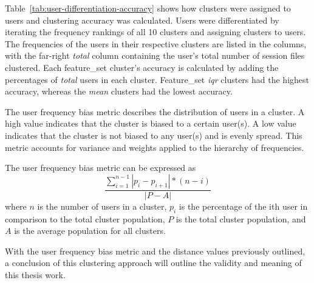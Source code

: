 Table~\ref{tab:user-differentiation-accuracy} shows how clusters were assigned to users and clustering accuracy was calculated. Users were differentiated by iterating the frequency rankings of all 10 clusters and assigning clusters to users. The frequencies of the users in their respective clusters are listed in the columns, with the far-right \textit{total} column containing the user's total number of session files clustered. Each feature{\_}set cluster's accuracy is calculated by adding the percentages of \textit{total} users in each cluster. Feature{\_}set \textit{iqr} clusters had the highest accuracy, whereas the \textit{mean} clusters had the lowest accuracy.

The user frequency bias metric describes the distribution of users in a cluster.
A high value indicates that the cluster is biased to a certain user(s).
A low value indicates that the cluster is not biased to any user(s) and is evenly spread. This metric accounts for variance and weights applied to the hierarchy of frequencies.

\bigbreak
\bigbreak
\bigbreak
\bigbreak
\bigbreak
\bigbreak
\bigbreak
The user frequency bias metric can be expressed as
\[ \frac{\sum_{i=1}^{n-1} |p_i - p_{i+1}| * (n-i)}{|P-A|} \]
where $n$ is the number of users in a cluster, $p_i$ is the percentage of the ith user in comparison to the total cluster population, $P$ is the total cluster population, and $A$ is the average population for all clusters.

With the user frequency bias metric and the distance values previously outlined, a conclusion of this clustering approach will outline the validity and meaning of this thesis work.

%
